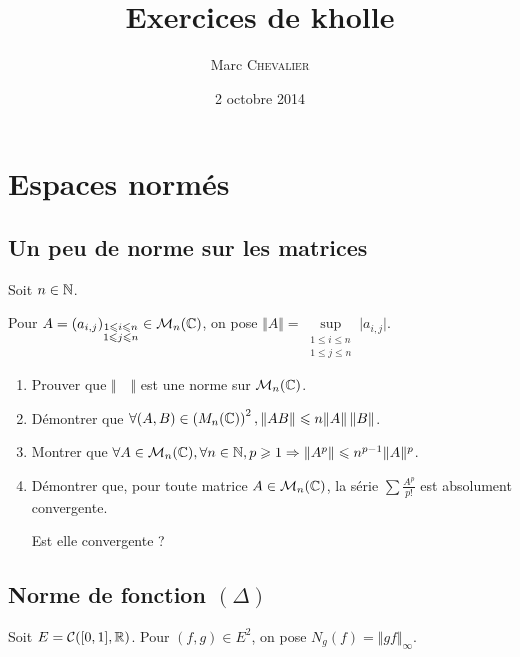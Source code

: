 

\title{Exercices de kholle}
\author{Marc \textsc{Chevalier}}
\date{2 octobre 2014}


\maketitle
\setcounter{tocdepth}{2}
\tableofcontents

\section{Espaces normés}

\subsection{Un peu de norme sur les matrices}
Soit $n\in\mathbb{N}$.

Pour $A=\left(a_{i,j}\right)_{\substack{1\leqslant i\leqslant n \\ 1 \leqslant j \leqslant n}}\in\mathcal{M}_n(\mathbb{C})$, on pose $\Vert A \Vert = \sup\limits_{\substack{1\leqslant i\leqslant n \\ 1 \leqslant j \leqslant n}} \vert a_{i,j}\vert$.

\begin{enumerate}
    \item Prouver que $\Vert\quad\Vert$ est une norme sur $\mathcal{M}_n(\mathbb{C})$.

    \item Démontrer que $\forall (A,B)\in \left(M_n(\mathbb{C})\right)^2, \Vert AB \Vert \leqslant n \Vert A\Vert\,\Vert B \Vert$.

    \item Montrer que $\forall A\in\mathcal{M}_n(\mathbb{C}), \forall n\in\mathbb{N}, p\geqslant 1 \Rightarrow \Vert A^p\Vert \leqslant n^{p-1} \Vert A \Vert^p$.

    \item Démontrer que, pour toute matrice $A\in\mathcal{M}_n(\mathbb{C})$, la série $\sum\frac{A^p}{p!}$ est absolument convergente. 

Est elle convergente ?
\end{enumerate}
 
\subsection{Norme de fonction \texorpdfstring{$(\Delta)$}{Delta}}

Soit $E=\mathcal{C}([0,1],\mathbb{R})$. Pour $(f,g)\in E^2$, on pose $N_g(f)=\Vert gf\Vert_\infty$.

